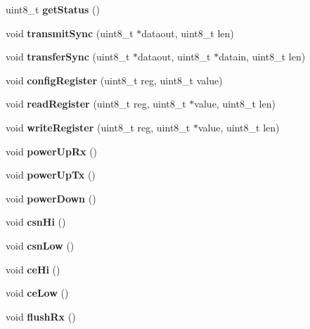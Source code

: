 \begin{DoxyCompactItemize}
\item 
\mbox{\label{class_nrf24l_a435b3528e7a32efa94b532d1c5a36a71}} 
uint8\+\_\+t {\bfseries get\+Status} ()
\item 
\mbox{\label{class_nrf24l_a1145b9249880d2d3440aba6ac416d57b}} 
void {\bfseries transmit\+Sync} (uint8\+\_\+t $\ast$dataout, uint8\+\_\+t len)
\item 
\mbox{\label{class_nrf24l_ac3ba3684eec97bbd187b02d681168068}} 
void {\bfseries transfer\+Sync} (uint8\+\_\+t $\ast$dataout, uint8\+\_\+t $\ast$datain, uint8\+\_\+t len)
\item 
\mbox{\label{class_nrf24l_a916824f661d523f431d8b4b56e65fe0b}} 
void {\bfseries config\+Register} (uint8\+\_\+t reg, uint8\+\_\+t value)
\item 
\mbox{\label{class_nrf24l_aa954e3b361984ea179ac9023e5c1344a}} 
void {\bfseries read\+Register} (uint8\+\_\+t reg, uint8\+\_\+t $\ast$value, uint8\+\_\+t len)
\item 
\mbox{\label{class_nrf24l_a67bbc0f50e371849555d21c43d8002b2}} 
void {\bfseries write\+Register} (uint8\+\_\+t reg, uint8\+\_\+t $\ast$value, uint8\+\_\+t len)
\item 
\mbox{\label{class_nrf24l_a5c1ebb7df24aec45cd0c8d160f6cb8ed}} 
void {\bfseries power\+Up\+Rx} ()
\item 
\mbox{\label{class_nrf24l_a2b0fd66684fea113c76238350d99b196}} 
void {\bfseries power\+Up\+Tx} ()
\item 
\mbox{\label{class_nrf24l_aa27a91c357a802bc7ce3dff98c7857f4}} 
void {\bfseries power\+Down} ()
\item 
\mbox{\label{class_nrf24l_a55862eb99f50e21371fa8a53a4426969}} 
void {\bfseries csn\+Hi} ()
\item 
\mbox{\label{class_nrf24l_a138f1f3902125a5028d5118098f19178}} 
void {\bfseries csn\+Low} ()
\item 
\mbox{\label{class_nrf24l_aaa9bd75850c48a8d71f6770ae2840684}} 
void {\bfseries ce\+Hi} ()
\item 
\mbox{\label{class_nrf24l_a220afd8660aa3b4c4129c331f422cdd9}} 
void {\bfseries ce\+Low} ()
\item 
\mbox{\label{class_nrf24l_a109f0db66b1250b772dd898f86dad278}} 
void {\bfseries flush\+Rx} ()
\end{DoxyCompactItemize}
